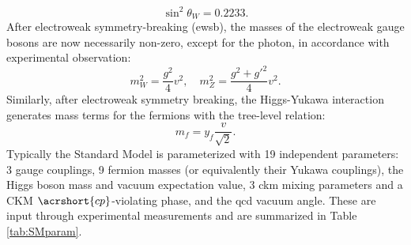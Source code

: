 \begin{equation}
\sin^2\theta_{W}=0.2233.
\end{equation}
After electroweak symmetry-breaking (\acrshort{ewsb}), the masses of the electroweak gauge bosons are now necessarily non-zero, except for the photon, in accordance with experimental observation: 
\begin{equation}
m^2_{W}=\frac{g^2}{4}v^2,\quad m^2_{Z}=\frac{g^2+g'^2}{4}v^2. \label{eqn:wzmasses}
\end{equation}
Similarly, after electroweak symmetry breaking, the Higgs-Yukawa interaction generates mass terms for the fermions with the tree-level relation:
\begin{equation}
m_{f}=y_{f}\frac{v}{\sqrt{2}}.
\end{equation}
Typically the Standard Model is parameterized with 19 independent parameters: 3 gauge couplings, 9 fermion masses (or equivalently their Yukawa couplings), the Higgs boson mass and vacuum expectation value, 3 \acrshort{ckm} mixing parameters and a CKM $\acrshort{cp}$-violating phase, and the \acrshort{qcd} vacuum angle. These are input through experimental measurements and are summarized in Table \ref{tab:SMparam}.
\newpage

